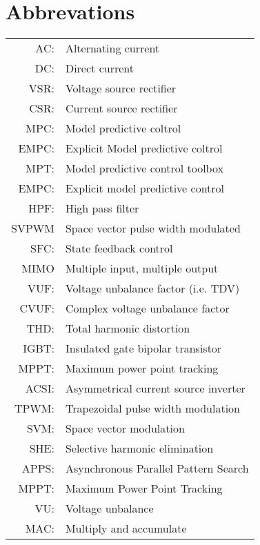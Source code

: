\section{Abbrevations}
\begin{longtable}{r l}
	AC:				& Alternating current\\
	DC:				& Direct current\\
  VSR:      & Voltage source rectifier \\
  CSR:      & Current source rectifier \\
  MPC:      & Model predictive coltrol\\
	EMPC:      & Explicit Model predictive coltrol\\
  MPT:      & Model predictive control toolbox\\
  EMPC:     & Explicit model predictive control\\
  HPF:      & High pass filter\\
  SVPWM     & Space vector pulse width modulated\\
  SFC:      & State feedback control\\
	MIMO			& Multiple input, multiple output\\
  VUF:      & Voltage unbalance factor (i.e. TDV)\\
	CVUF:			& Complex voltage unbalance factor\\
  THD:      & Total harmonic distortion\\
  IGBT:     & Insulated gate bipolar transistor\\
  MPPT:     & Maximum power point tracking\\
	ACSI:			& Asymmetrical current source inverter\\
	TPWM:			& Trapezoidal pulse width modulation\\
	SVM:			& Space vector modulation\\
	SHE:			& Selective harmonic elimination\\
	APPS:			& Asynchronous Parallel Pattern Search\\
	MPPT:			& Maximum Power Point Tracking\\
VU:          &Voltage unbalance\\
MAC:        & Multiply and accumulate\\

\end{longtable} 